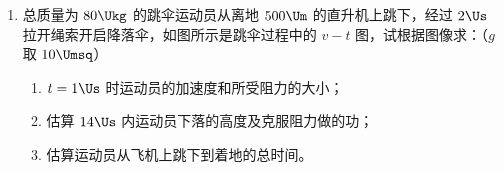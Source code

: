 \documentclass[\gkver]{gaokaozhenti}
\begin{document}
\begin{enumerate}
{\textbf{B．}（1）输电线上的电流强度为 $I=\frac{P}{U}=\frac{20\times10^{3}}{380}\UA=52.63\UA$，输电线损耗的功率为 $P_{\text{损}}=I^{2}R=52.63^{2}\times6\UW=16620\UW=16.62\UkW$。

（2）改用高压输电后，输电线上的电流强度变为 $I'=\frac{P}{U'}=\frac{20\times10^{3}}{5000}\UA=4\UA$；用户端在变压器降压前获得的电压 $U_{1}=U-I'R=(5000-4\times6)\UV=4976\UV$；根据 $\frac{U_{1}}{U_{2}}=\frac{n_{1}}{n_{2}}$，用户得到的电压为 $U_{2}=\frac{n_{2}}{n_{1}}U_{1}=\frac{1}{22}\times4976\UV=226.18\UV$。
}

\item
总质量为 $80\Ukg$ 的跳伞运动员从离地 $500\Um$ 的直升机上跳下，经过 $2\Us$ 拉开绳索开启降落伞，如图所示是跳伞过程中的 $v-t$ 图，试根据图像求：（$g$ 取 $10\Umsq$）

\begin{enumerate}
	\item
	$t=1\Us$ 时运动员的加速度和所受阻力的大小；
	\item
	估算 $14\Us$ 内运动员下落的高度及克服阻力做的功；
	\item
	估算运动员从飞机上跳下到着地的总时间。
\end{enumerate}

\onepicture[align=right, w=6.68cm]{}




\end{enumerate}
\end{document}
